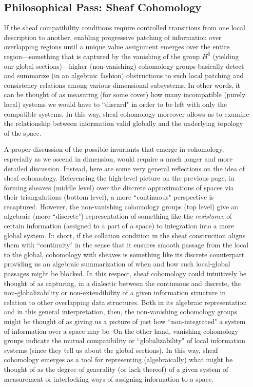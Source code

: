\documentclass[11pt]{book}
\theoremstyle{definition}
\theoremstyle{definition}
\theoremstyle{definition}
\theoremstyle{theorem}
\theoremstyle{definition}
\begin{document}
\subsection{Philosophical Pass: Sheaf Cohomology}
If the sheaf compatibility conditions require controlled transitions from one local description to another, enabling progressive patching of information over overlapping regions until a unique value assignment emerges over the entire region---something that is captured by the vanishing of the group $H^0$ (yielding our global sections)---higher (non-vanishing) cohomology groups basically detect and summarize (in an algebraic fashion) obstructions to such local patching and consistency relations among various dimensional subsystems. In other words, it can be thought of as measuring (for some cover) how many incompatible (purely local) systems we would have to ``discard" in order to be left with only the compatible systems. In this way, sheaf cohomology moreover allows us to examine the relationship between information valid globally and the underlying topology of the space. \par 
A proper discussion of the possible invariants that emerge in cohomology, especially as we ascend in dimension, would require a much longer and more detailed discussion. Instead, here are some very general reflections on the idea of sheaf cohomology. Referencing the high-level picture on the previous page, in forming sheaves (middle level) over the discrete approximations of spaces via their triangulations (bottom level), a more ``continuous" perspective is recaptured. However, the non-vanishing cohomology groups (top level) give an algebraic (more ``discrete") representation of something like the \textit{resistance} of certain information (assigned to a part of a space) to integration into a more global system. In short, if the collation condition in the sheaf construction aligns them with ``continuity" in the sense that it ensures smooth passage from the local to the global, cohomology with sheaves is something like its discrete counterpart providing us an algebraic summarization of when and how such local-global passages might be blocked. In this respect, sheaf cohomology could intuitively be thought of as capturing, in a dialectic between the continuous and discrete, the non-globalizability or non-extendibility of a given information structure in relation to other overlapping data structures. Both in its algebraic representation and in this general interpretation, then, the non-vanishing cohomology groups might be thought of as giving us a picture of just how ``non-integrated" a system of information over a space may be. On the other hand, vanishing cohomology groups indicate the mutual compatibility or ``globalizability" of local information systems (since they tell us about the global sections). In this way, sheaf cohomology emerges as a tool for representing (algebraically) what might be thought of as the degree of generality (or lack thereof) of a given system of measurement or interlocking ways of assigning information to a space. \par 
\end{document}

